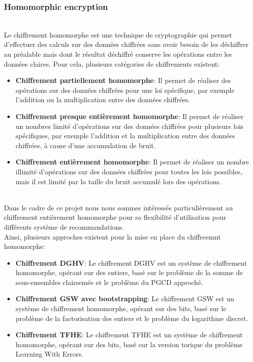 \documentclass{article}
\begin{document}
\subsubsection{Homomorphic encryption}
$ $\\
Le chiffrement homomorphe est une technique de cryptographie qui permet d'effectuer des calculs sur des données chiffrées sans avoir besoin de les déchiffrer au préalable mais dont le résultat déchiffré conserve les opérations entre les données claires.
Pour cela, plusieurs catégories de chiffrements existent:\\
\begin{itemize}
    \item \textbf{Chiffrement partiellement homomorphe}: Il permet de réaliser des opérations sur des données chiffrées pour une loi spécifique, par exemple l'addition ou la multiplication entre des données chiffrées.
    \item \textbf{Chiffrement presque entièrement homomorphe}: Il permet de réaliser un nombres limité d'opérations sur des données chiffrées pour plusieurs lois spécifiques, par exemple l'addition et la multiplication entre des données chiffrées, à cause d'une accumulation de bruit.
    \item \textbf{Chiffrement entièrement homomorphe}: Il permet de réaliser un nombre illimité d'opérations sur des données chiffrées pour toutes les lois possibles, mais il est limité par la taille du bruit accumulé lors des opérations.
\end{itemize}
$ $\\
Dans le cadre de ce projet nous nous sommes intéressés particulièrement au chiffrement entièrement homomorphe pour sa flexibilité d'utilisation pour différents système de recommandations.\\
Ainsi, plusieurs approches existent pour la mise en place du chiffreemnt homomorphe: \\
\begin{itemize}
    \item \textbf{Chiffrement DGHV}: Le chiffrement DGHV est un système de chiffrement homomorphe, opérant sur des entiers, basé sur le problème de la somme de sous-ensembles clairsemée et le problème du PGCD approché.
    \item \textbf{Chiffrement GSW avec bootstrapping}: Le chiffrement GSW est un système de chiffrement homomorphe, opérant sur des bits, basé sur le problème de la factorisation des entiers et le problème du logarithme discret.
    \item \textbf{Chiffrement TFHE}: Le chiffrement TFHE est un système de chiffrement homomorphe, opérant sur des bits, basé sur la version torique du problème Learning With Errors.
\end{itemize}
\end{document}
